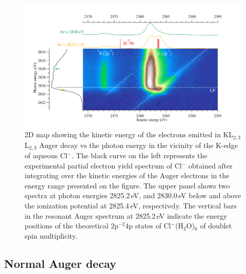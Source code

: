 \begin{figure}%
\centering
\includegraphics[scale=0.55]{figures/cl_2dmap.pdf}
\caption{2D map showing the kinetic energy of the electrons emitted in KL$_{2,3}$L$_{2,3}$ Auger decay vs the photon energy in the vicinity of the K-edge of aqueous Cl$^{-}$. The black curve on the left represents the experimental partial electron yield spectrum of Cl$^{-}$ obtained after integrating over the kinetic energies of the Auger electrons in the energy range presented on the figure. The upper panel shows two spectra at photon energies 2825.2\,eV, and 2830.0\,eV below and above the ionization potential at 2825.4\,eV, respectively. The vertical bars in the resonant Auger spectrum at 2825.2\,eV indicate the energy positions of the theoretical 2p$^{-2}$4p states of Cl$^{-}$(H$_2$O)$_6$ of doublet spin multiplicity.}
\label{fg:2dmap_cl}
\end{figure}


\subsection{Normal Auger decay}\label{ssec:na}

